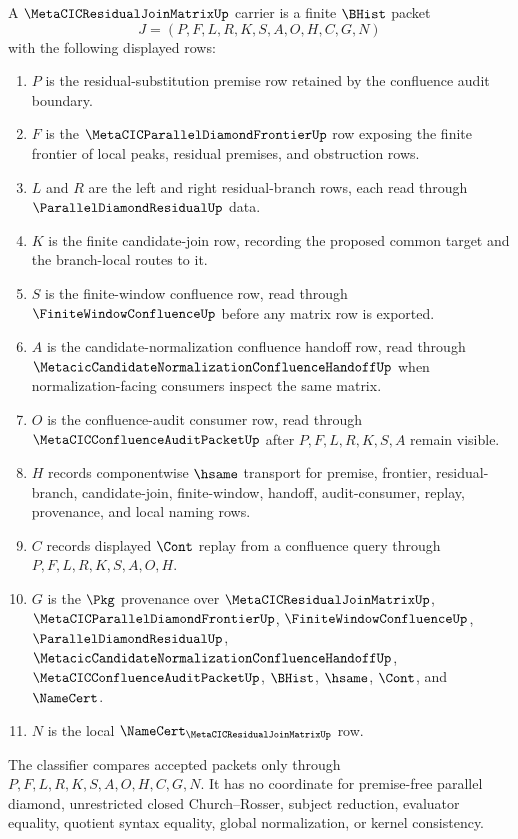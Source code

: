 \begin{definition}
\label{def:metacic-residual-join-matrix-carrier}
A $\MetaCICResidualJoinMatrixUp$ carrier is a finite $\BHist$ packet
$$
J=(P,F,L,R,K,S,A,O,H,C,G,N)
$$
with the following displayed rows:
\begin{enumerate}
\item $P$ is the residual-substitution premise row retained by the confluence audit boundary.
\item $F$ is the $\MetaCICParallelDiamondFrontierUp$ row exposing the finite frontier of local peaks, residual premises, and obstruction rows.
\item $L$ and $R$ are the left and right residual-branch rows, each read through $\ParallelDiamondResidualUp$ data.
\item $K$ is the finite candidate-join row, recording the proposed common target and the branch-local routes to it.
\item $S$ is the finite-window confluence row, read through $\FiniteWindowConfluenceUp$ before any matrix row is exported.
\item $A$ is the candidate-normalization confluence handoff row, read through $\MetacicCandidateNormalizationConfluenceHandoffUp$ when normalization-facing consumers inspect the same matrix.
\item $O$ is the confluence-audit consumer row, read through $\MetaCICConfluenceAuditPacketUp$ after $P,F,L,R,K,S,A$ remain visible.
\item $H$ records componentwise $\hsame$ transport for premise, frontier, residual-branch, candidate-join, finite-window, handoff, audit-consumer, replay, provenance, and local naming rows.
\item $C$ records displayed $\Cont$ replay from a confluence query through $P,F,L,R,K,S,A,O,H$.
\item $G$ is the $\Pkg$ provenance over $\MetaCICResidualJoinMatrixUp$, $\MetaCICParallelDiamondFrontierUp$, $\FiniteWindowConfluenceUp$, $\ParallelDiamondResidualUp$, $\MetacicCandidateNormalizationConfluenceHandoffUp$, $\MetaCICConfluenceAuditPacketUp$, $\BHist$, $\hsame$, $\Cont$, and $\NameCert$.
\item $N$ is the local $\NameCert_{\MetaCICResidualJoinMatrixUp}$ row.
\end{enumerate}
The classifier compares accepted packets only through $P,F,L,R,K,S,A,O,H,C,G,N$. It has no coordinate for premise-free parallel diamond, unrestricted closed Church--Rosser, subject reduction, evaluator equality, quotient syntax equality, global normalization, or kernel consistency.
\end{definition}

